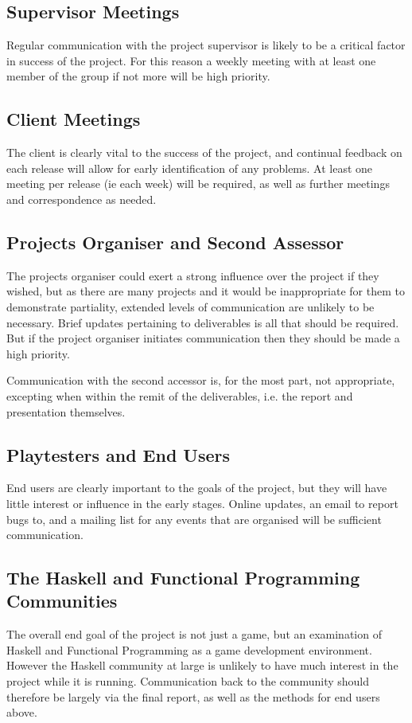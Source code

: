 \subsection{Supervisor Meetings}

Regular communication with the project supervisor is likely to be a critical factor in success of the project. For this reason a weekly meeting with at least one member of the group if not more will be high priority.

\subsection{Client Meetings}

The client is clearly vital to the success of the project, and continual feedback on each release will allow for early identification of any problems. At least one meeting per release (ie each week) will be required, as well as further meetings and correspondence as needed.

\subsection{Projects Organiser and Second Assessor}

The projects organiser could exert a strong influence over the project if they wished, but as there are many projects and it would be inappropriate for them to demonstrate partiality, extended levels of communication are unlikely to be necessary. Brief updates pertaining to deliverables is all that should be required. But if the project organiser initiates communication then they should be made a high priority.

Communication with the second accessor is, for the most part, not appropriate, excepting when within the remit of the deliverables, i.e. the report and presentation themselves.

\subsection{Playtesters and End Users}

End users are clearly important to the goals of the project, but they will have little interest or influence in the early stages. Online updates, an email to report bugs to, and a mailing list for any events that are organised will be sufficient communication.

\subsection{The Haskell and Functional Programming Communities}

The overall end goal of the project is not just a game, but an examination of Haskell and Functional Programming as a game development environment. However the Haskell community at large is unlikely to have much interest in the project while it is running. Communication back to the community should therefore be largely via the final report, as well as the methods for end users above.


